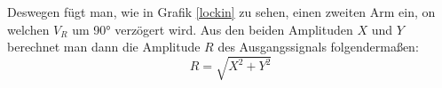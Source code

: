  Deswegen fügt man, wie in Grafik \ref{lockin} zu sehen, einen zweiten Arm ein, on welchen $V_R$ 
um 90° verzögert wird. Aus den beiden Amplituden $X$ und $Y$ berechnet man dann die Amplitude $R$ des Ausgangssignals folgendermaßen:
\begin{equation*}
    R = \sqrt{X^{2}+Y^{2}}
\end{equation*}
  

